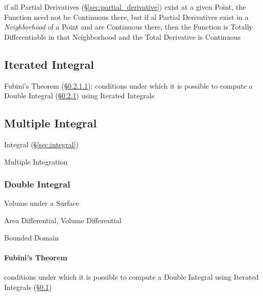 if all Partial Derivatives (\S\ref{sec:partial_derivative}) exist at a given
Point, the Function need not be Continuous there, but if al Partial Derivatives
exist in a \emph{Neighborhood} of a Point and are Continuous there, then the
Function is Totally Differentiable in that Neighborhood and the Total Derivative
is Continuous



\subsection{Iterated Integral}\label{sec:iterated_integral}

\fist Fubini's Theorem (\S\ref{sec:fubinis_theorem}): conditions under which it
is possible to compute a Double Integral (\S\ref{sec:double_integral}) using
Iterated Integrals



\subsection{Multiple Integral}\label{sec:multiple_integral}

Integral (\S\ref{sec:integral})

Multiple Integration



\subsubsection{Double Integral}\label{sec:double_integral}

Volume under a Surface

Area Differential, Volume Differential

Bounded Domain



\paragraph{Fubini's Theorem}\label{sec:fubinis_theorem}\hfill

conditions under which it is possible to compute a Double Integral using
Iterated Integrals (\S\ref{sec:iterated_integral})



